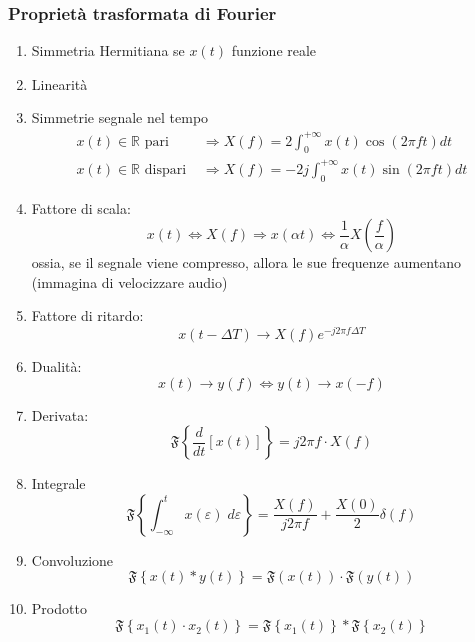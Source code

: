 \subsubsection*{Proprietà trasformata di Fourier}
\begin{enumerate}
	\item Simmetria Hermitiana se $ x\left(t\right) $ funzione reale
	\item Linearità
	\item Simmetrie segnale nel tempo
	      \begin{align*}
		      x(t) \in \mathbb{R} \text { pari }    & \Rightarrow X(f)=2 \int_0^{+\infty} x(t) \cos (2 \pi f t) d t    \\
		      x(t) \in \mathbb{R} \text { dispari } & \Rightarrow X(f)=-2 j \int_0^{+\infty} x(t) \sin (2 \pi f t) d t
	      \end{align*}
	\item Fattore di scala:
	      \[
		      x\left(t\right) \Leftrightarrow X\left(f\right) \Rightarrow x\left(\alpha t\right) \Leftrightarrow \frac{1}{\alpha }X \left(\frac{f}{\alpha} \right)
	      \]
	      ossia, se il segnale viene compresso, allora le sue frequenze aumentano (immagina di velocizzare audio)
	\item Fattore di ritardo:
	      \[
		      x\left(t - \Delta T \right) \rightarrow X\left(f\right)e^{-j2 \pi f \Delta T }
	      \]
	\item Dualità:
	      \[
		      x\left(t\right) \rightarrow y\left(f\right) \Leftrightarrow y\left(t\right) \rightarrow  x\left(-f\right)
	      \]
	\item Derivata:
	      \[
		      \mathfrak{F}\left\{ \frac{d}{dt} \left[x\left(t\right)\right]\right\} = j 2 \pi f \cdot X\left(f\right)
	      \]
	\item Integrale
	      \[
		      \mathfrak{F}\left\{\int_{-\infty }^{t} x\left(\varepsilon \right) \; d\varepsilon \right\} = \frac{X\left(f\right)}{j 2 \pi  f} + \frac{X\left(0\right)}{2} \delta \left(f\right)
	      \]
	\item Convoluzione
	      \[
		      \mathfrak{F} \left\{x\left(t\right)* y\left(t\right)\right\} = \mathfrak{F}\left(x\left(t\right)\right) \cdot \mathfrak{F}\left(y\left(t\right)\right)
	      \]
	\item Prodotto
	      \[
		      \mathfrak{F} \left\{x_1\left(t\right) \cdot  x_2\left(t\right)\right\} = \mathfrak{F} \left\{x_1\left(t\right)\right\} * \mathfrak{F} \left\{x_2\left(t\right)\right\}
	      \]
\end{enumerate}
